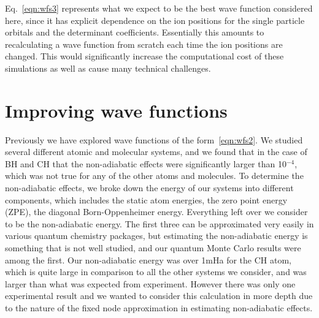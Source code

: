 \documentclass[aip,jcp,numerical,reprint]{revtex4-1}
\begin{document}
Eq.~\eqref{eqn:wfs3} represents what we expect to be the best wave function considered here, since it has explicit dependence on the ion positions for the single particle orbitals and the determinant coefficients. Essentially this amounts to recalculating a wave function from scratch each time the ion positions are changed.  This would significantly increase the computational cost of these simulations as well as cause many technical challenges. 


\section{Improving wave functions}
Previously we have explored wave functions of the form~\eqref{eqn:wfs2}.  We studied several different atomic and molecular systems, and we found that in the case of BH and CH that the non-adiabatic effects were  significantly larger than 10$^{-4}$, which was not true for any of the other atoms and molecules.  To determine the non-adiabatic effects, we broke down the energy of our systems into different components, which includes the static atom energies, the zero point energy (ZPE), the diagonal Born-Oppenheimer energy.   Everything left over we consider to be the non-adiabatic energy.   The first three can be approximated very easily in various quantum chemistry packages, but estimating the non-adiabatic energy is something that is not well studied, and our quantum Monte Carlo results were among the first.  Our non-adiabatic energy was over 1mHa for the CH atom, which is quite large in comparison to all the other systems we consider, and was larger than what was expected from experiment.  However there was only one experimental result and we wanted to consider this calculation in more depth due to the nature of the fixed node approximation in estimating non-adiabatic effects.
\end{document}
